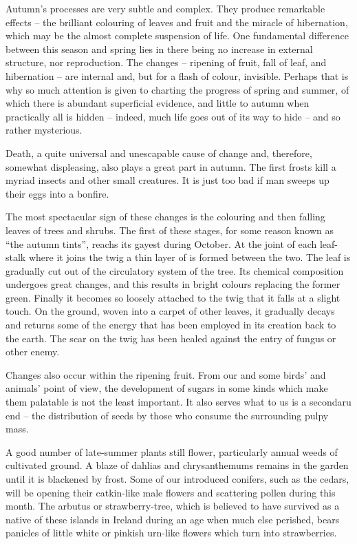 Autumn's processes are very subtle and complex. They produce remarkable effects -- the brilliant colouring of leaves and fruit and the miracle of hibernation, which may be the almost complete suspension of life. One fundamental difference between this season and spring lies in there being no increase in external structure, nor reproduction. The changes -- ripening of fruit, fall of leaf, and hibernation -- are internal and, but for a flash of colour, invisible. Perhaps that is why so much attention is given to charting the progress of spring and summer, of which there is abundant superficial evidence, and little to autumn when practically all is hidden -- indeed, much life goes out of its way to hide -- and so rather mysterious.

Death, a quite universal and unescapable cause of change and, therefore, somewhat displeasing, also plays a great part in autumn. The first frosts kill a myriad insects and other small creatures. It is just too bad if man sweeps up their eggs into a bonfire.

The most spectacular sign of these changes is the colouring and then falling leaves of trees and shrubs. The first of these stages, for some reason known as ``the autumn tints'', reachs its gayest during October. At the joint of each leaf-stalk where it joins the twig a thin layer of is formed between the two. The leaf is gradually cut out of the circulatory system of the tree. Its chemical composition undergoes great changes, and this results in bright colours replacing the former green. Finally it becomes so loosely attached to the twig that it falls at a slight touch. On the ground, woven into a carpet of other leaves, it gradually decays and returns some of the energy that has been employed in its creation back to the earth. The scar on the twig has been healed against the entry of fungus or other enemy.

Changes also occur within the ripening fruit. From our and some birds' and animals' point of view, the development of sugars in some kinds which make them palatable is not the least important. It also serves what to us is a secondaru end -- the distribution of seeds by those who consume the surrounding pulpy mass.

A good number of late-summer plants still flower, particularly annual weeds of cultivated ground. A blaze of dahlias and chrysanthemums remains in the garden until it is blackened by frost. Some of our introduced conifers, such as the cedars, will be opening their catkin-like male flowers and scattering pollen during this month. The arbutus or strawberry-tree, which is believed to have survived as a native of these islands in Ireland during an age when much else perished, bears panicles of little white or pinkish urn-like flowers which turn into strawberries.

